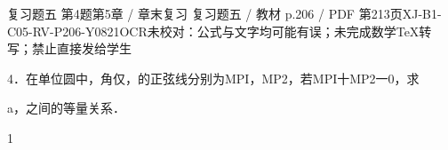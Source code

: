 \begin{bankitem}{复习题五 第4题}{第5章 / 章末复习 复习题五 / 教材 p.206 / PDF 第213页}{XJ-B1-C05-RV-P206-Y0821}{OCR未校对：公式与文字均可能有误；未完成数学TeX转写；禁止直接发给学生}
\begin{ocrdraft}
\par
4．在单位圆中，角仅，的正弦线分别为MPI，MP2，若MPI十MP2一0，求
\par
a，之间的等量关系．
\par
1
\end{ocrdraft}
\end{bankitem}
